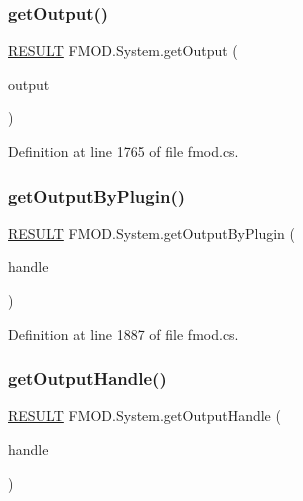 \subsubsection{\texorpdfstring{get\+Output()}{getOutput()}}
{\footnotesize\ttfamily \hyperlink{namespace_f_m_o_d_a305d1176ef3f8c8815861a60407ac33d}{R\+E\+S\+U\+LT} F\+M\+O\+D.\+System.\+get\+Output (\begin{DoxyParamCaption}\item[{out \hyperlink{namespace_f_m_o_d_a79371777bf570d74477038541f318485}{O\+U\+T\+P\+U\+T\+T\+Y\+PE}}]{output }\end{DoxyParamCaption})}



Definition at line 1765 of file fmod.\+cs.

\mbox{\label{class_f_m_o_d_1_1_system_a613e0b33b13d4db91f355aa4a21215e4}} 
\subsubsection{\texorpdfstring{get\+Output\+By\+Plugin()}{getOutputByPlugin()}}
{\footnotesize\ttfamily \hyperlink{namespace_f_m_o_d_a305d1176ef3f8c8815861a60407ac33d}{R\+E\+S\+U\+LT} F\+M\+O\+D.\+System.\+get\+Output\+By\+Plugin (\begin{DoxyParamCaption}\item[{out uint}]{handle }\end{DoxyParamCaption})}



Definition at line 1887 of file fmod.\+cs.

\mbox{\label{class_f_m_o_d_1_1_system_aabf47dcc04f433fad4d82f5255c51eeb}} 
\subsubsection{\texorpdfstring{get\+Output\+Handle()}{getOutputHandle()}}
{\footnotesize\ttfamily \hyperlink{namespace_f_m_o_d_a305d1176ef3f8c8815861a60407ac33d}{R\+E\+S\+U\+LT} F\+M\+O\+D.\+System.\+get\+Output\+Handle (\begin{DoxyParamCaption}\item[{out Int\+Ptr}]{handle }\end{DoxyParamCaption})}



